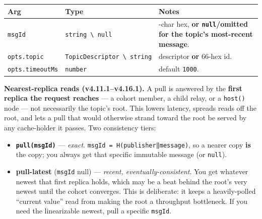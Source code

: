 \documentclass[
  nobib]{tufte-handout}
\newcounter{none} %
\providecommand{\tightlist}{%
  \setlength{\itemsep}{0pt}\setlength{\parskip}{0pt}}
\begin{document}
{\def\LTcaptype{none} %
\begin{longtable}[]{@{}
  >{\raggedright\arraybackslash}p{}
  >{\raggedright\arraybackslash}p{}
  >{\raggedright\arraybackslash}p{}@{}}
\toprule\noalign{}
\begin{minipage}[b]{\linewidth}\raggedright
Arg
\end{minipage} & \begin{minipage}[b]{\linewidth}\raggedright
Type
\end{minipage} & \begin{minipage}[b]{\linewidth}\raggedright
Notes
\end{minipage} \\
\midrule\noalign{}
\endhead
\bottomrule\noalign{}
\endlastfoot
\texttt{msgId} & \texttt{string\ \textbackslash{}\textbar{}\ null} &
64-char hex, \textbf{or \texttt{null}/omitted for the topic's
most-recent message}. \\
\texttt{opts.topic} &
\texttt{TopicDescriptor\ \textbackslash{}\textbar{}\ string} &
descriptor \textbf{or} 66-hex id. \\
\texttt{opts.timeoutMs} & \texttt{number} & default \texttt{1000}. \\
\end{longtable}
}

\textbf{Nearest-replica reads (v4.11.1--v4.16.1).} A pull is answered by
the \textbf{first replica the request reaches} --- a cohort member, a
child relay, or a \texttt{host()} node --- not necessarily the topic's
root. This lowers latency, spreads reads off the root, and lets a pull
that would otherwise strand toward the root be served by any
cache-holder it passes. Two consistency tiers:

\begin{itemize}
\tightlist
\item
  \textbf{\texttt{pull(msgId)}} --- \emph{exact}.
  \texttt{msgId\ =\ H(publisher‖message)}, so a nearer copy \textbf{is}
  the copy; you always get that specific immutable message (or
  \texttt{null}).
\item
  \textbf{pull-latest} (\texttt{msgId} null) --- \emph{recent,
  eventually-consistent}. You get whatever newest that first replica
  holds, which may be a beat behind the root's very newest until the
  cohort converges. This is deliberate: it keeps a heavily-polled
  ``current value'' read from making the root a throughput bottleneck.
  If you need the linearizable newest, pull a specific \texttt{msgId}.
\end{itemize}
\end{document}
